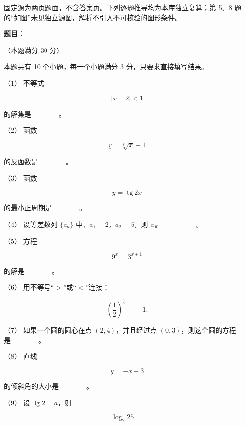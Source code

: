 

\begin{gktip}
固定源为两页题面，不含答案页。下列逐题推导均为本库独立复算；第 5、8 题的“如图”未见独立源图，解析不引入不可核验的图形条件。
\end{gktip}

\begin{answer}

\textbf{题目}：

（本题满分 30 分）

本题共有 10 个小题，每一个小题满分 3 分，只要求直接填写结果。

（1） 不等式

\nopagebreak[4]
\[
|x+2|<1
\]

的解集是　　　　。

（2） 函数

\nopagebreak[4]
\[
y=\sqrt[8]{x}-1
\]

的反函数是　　　　。

（3） 函数

\nopagebreak[4]
\[
y=\operatorname{tg}2x
\]

的最小正周期是　　　　。

（4） 设等差数列 $\{a_n\}$ 中，$a_1=2$，$a_2=5$，则
$a_{10}=$　　　　。

（5） 方程

\nopagebreak[4]
\[
9^x=3^{x+1}
\]

的解是　　　　。

（6） 用不等号“$>$”或“$<$”连接：

\nopagebreak[4]
\[
\left(\frac12\right)^{\frac17}\ \underline{\hspace{2em}}\ 1.
\]

（7） 如果一个圆的圆心在点 $(2,4)$，并且经过点 $(0,3)$，则这个圆的方程是　　　　。

（8） 直线

\nopagebreak[4]
\[
y=-x+3
\]

的倾斜角的大小是　　　　。

（9） 设 $\lg2=a$，则

\nopagebreak[4]
\[
\log_2 25=
\]


\end{answer}
